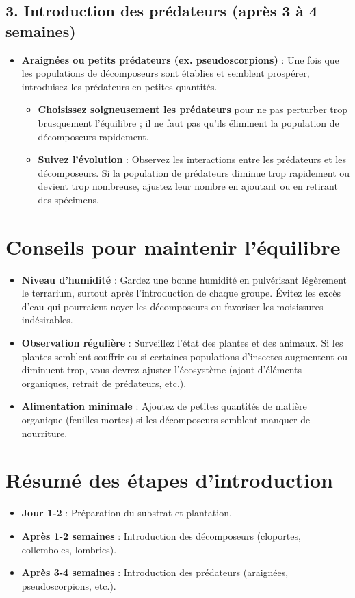 \subsection*{3. Introduction des prédateurs (après 3 à 4 semaines)}
\begin{itemize}
    \item \textbf{Araignées ou petits prédateurs (ex. pseudoscorpions)} : Une fois que les populations de décomposeurs sont établies et semblent prospérer, introduisez les prédateurs en petites quantités.
    \begin{itemize}
        \item \textbf{Choisissez soigneusement les prédateurs} pour ne pas perturber trop brusquement l'équilibre ; il ne faut pas qu'ils éliminent la population de décomposeurs rapidement.
        \item \textbf{Suivez l'évolution} : Observez les interactions entre les prédateurs et les décomposeurs. Si la population de prédateurs diminue trop rapidement ou devient trop nombreuse, ajustez leur nombre en ajoutant ou en retirant des spécimens.
    \end{itemize}
\end{itemize}

\section{Conseils pour maintenir l'équilibre}
\begin{itemize}
    \item \textbf{Niveau d'humidité} : Gardez une bonne humidité en pulvérisant légèrement le terrarium, surtout après l'introduction de chaque groupe. Évitez les excès d'eau qui pourraient noyer les décomposeurs ou favoriser les moisissures indésirables.
    \item \textbf{Observation régulière} : Surveillez l'état des plantes et des animaux. Si les plantes semblent souffrir ou si certaines populations d'insectes augmentent ou diminuent trop, vous devrez ajuster l'écosystème (ajout d'éléments organiques, retrait de prédateurs, etc.).
    \item \textbf{Alimentation minimale} : Ajoutez de petites quantités de matière organique (feuilles mortes) si les décomposeurs semblent manquer de nourriture.
\end{itemize}

\section{Résumé des étapes d'introduction}
\begin{itemize}
    \item \textbf{Jour 1-2} : Préparation du substrat et plantation.
    \item \textbf{Après 1-2 semaines} : Introduction des décomposeurs (cloportes, collemboles, lombrics).
    \item \textbf{Après 3-4 semaines} : Introduction des prédateurs (araignées, pseudoscorpions, etc.).
\end{itemize}

